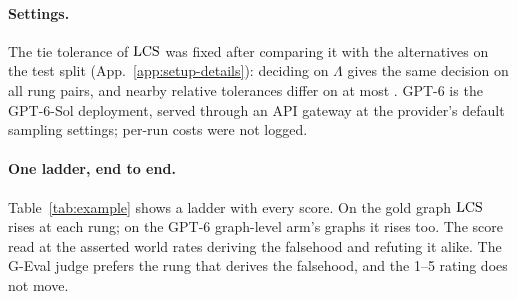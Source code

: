 \paragraph{Settings.} The tie tolerance of $\mathrm{LCS}$ was fixed after comparing it with the
alternatives on the test split (App.~\ref{app:setup-details}): deciding on $\Lambda$ gives the same
decision on all \sThreeLcsRulePairs{} rung pairs, and nearby relative tolerances differ on at most
\sThreeLcsRuleAltMaxDis. GPT-6 is the GPT-6-Sol deployment, served
through an API gateway at the provider's default sampling settings; per-run costs were not logged.



\paragraph{One ladder, end to end.} Table~\ref{tab:example} shows a  ladder with every
score. On the gold graph $\mathrm{LCS}$ rises at each rung; on the GPT-6 graph-level arm's graphs it rises too. The
score read at the asserted world rates deriving the falsehood and refuting it alike. The G-Eval judge
prefers the rung that derives the falsehood, and the 1--5 rating does not move.

